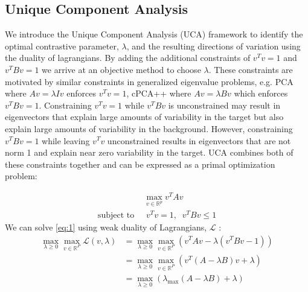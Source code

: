 \documentclass[12pt]{article}
\begin{document}
\subsection{Unique Component Analysis}
We introduce the Unique Component Analysis (UCA) framework to identify the optimal contrastive parameter, $\lambda$, and the resulting directions of variation using the duality of lagrangians.
By adding the additional constraints of $v^T v = 1$ and $v^T Bv = 1$ we arrive at an objective method to choose $\lambda$.
These constraints are motivated by similar constraints in generalized eigenvalue problems, e.g. PCA where $Av = \lambda Iv$ enforces $v^T v = 1$, cPCA++ where $Av = \lambda B v$ which enforces $v^T Bv = 1$. %
Constraining $v^T v = 1$ while $v^T Bv$ is unconstrained may result in eigenvectors that explain large amounts of variability in the target but also explain large amounts of variability in the background.
However, constraining $v^T Bv = 1$ while leaving $v^T v$ unconstrained results in eigenvectors that are not norm 1 and explain near zero variability in the target.
UCA combines both of these constraints together and can be expressed as a primal optimization problem:

\begin{align}
  &\max_{v\in \mathbb{R}^p}{v^TAv} \label{eq:1} \\ \text{subject to }&\; v^{T}v=1,\;\; v^TBv \leq 1 \nonumber
\end{align}
We can solve \ref{eq:1} using weak duality of Lagrangians, $\mathcal{L}$ :
\begin{align}
  \max_{\lambda \geq 0}{\max_{v\in \mathbb{R}^{P}}{\mathcal{L}}}\left(v,\lambda\right) &= \max_{\lambda \geq 0}{\max_{v\in \mathbb{R}^{P}}{\left( v^TAv - \lambda\left(v^TBv - 1\right)\right)}} \nonumber\\
                                                                                       &= \max_{\lambda \geq 0}{\max_{v\in \mathbb{R}^{P}}{\left(v^T\left(A - \lambda B\right)v + \lambda\right)}}\nonumber\\
                                                                                       &= \max_{\lambda \geq 0}{\left(\lambda_{\text{max}}\left(A - \lambda B\right) + \lambda\right)} \label{eq:2}
\end{align}
\end{document}
